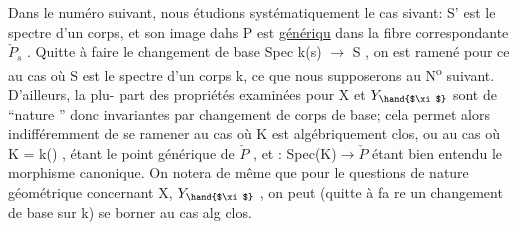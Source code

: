 Dans le numéro suivant, nous étudions systématiquement le cas
sivant: S' est le spectre d'un corps, et son image dahs P est \uline{génériqu}
dans la fibre correspondante $\check{P}_s$ . Quitte à faire le changement de base
Spec k(s) $\longrightarrow$ S , on est ramené pour ce au cas où S est le spectre
d'un corps k, ce que nous supposerons au N\textsuperscript{o} suivant. D'ailleurs, la plu-%
part des propriétés examinées pour X et $Y_{\hand{$\xi$}}$ sont de ``nature ''
donc invariantes par changement de corps de base; cela permet alors
indifféremment de se ramener au cas où K est algébriquement clos, ou au
cas où K = k(\hand{$\eta$}) , \hand{$\eta$} étant le point générique de $\check{P}$ , et \hand{$\xi$} : Spec(K)$\to\check{P}$
étant bien entendu le morphisme canonique. On notera de même que pour le
questions de nature géométrique concernant X, $Y_{\hand{$\xi$}}$ , on peut (quitte à fa
re un changement de base sur k) se borner au cas  alg clos.

